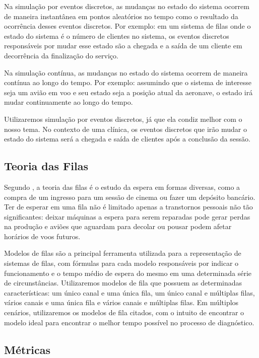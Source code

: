 \documentclass[
    12pt,
    openright,
    oneside,
    a4paper,
    english,
    brazil
]{abntex2}
\begin{document}
Na simulação por eventos discretos, as mudanças no estado do sistema ocorrem de maneira instantânea em pontos aleatórios no tempo como o resultado da ocorrência desses eventos discretos. Por exemplo: em um sistema de filas onde o estado do sistema é o número de clientes no sistema, os eventos discretos responsáveis por mudar esse estado são a chegada e a saída de um cliente em decorrência da finalização do serviço.

Na simulação contínua, as mudanças no estado do sistema ocorrem de maneira contínua ao longo do tempo. Por exemplo: assumindo que o sistema de interesse seja um avião em voo e seu estado seja a posição atual da aeronave, o estado irá mudar continuamente ao longo do tempo.

Utilizaremos simulação por eventos discretos, já que ela condiz melhor com o nosso tema. No contexto de uma clínica, os eventos discretos que irão mudar o estado do sistema será a chegada e saída de clientes após a conclusão da sessão.

\subsection{Teoria das Filas}

Segundo , a teoria das filas é o estudo da espera em formas diversas, como a compra de um ingresso para um sessão de cinema ou fazer um depósito bancário. Ter de esperar em uma fila não é limitado apenas a transtornos pessoais não tão significantes: deixar máquinas a espera para serem reparadas pode gerar perdas na produção e aviões que aguardam para decolar ou pousar podem afetar horários de voos futuros.

Modelos de filas são a principal ferramenta utilizada para a representação de sistemas de filas, com fórmulas para cada modelo responsáveis por indicar o funcionamento e o tempo médio de espera do mesmo em uma determinada série de circunstâncias. Utilizaremos modelos de fila que possuem as determinadas características: um único canal e uma única fila, um único canal e múltiplas filas, vários canais e uma única fila e vários canais e múltiplas filas. Em múltiplos cenários, utilizaremos os modelos de fila citados, com o intuito de encontrar o modelo ideal para encontrar o melhor tempo possível no processo de diagnóstico.

\subsection{Métricas}
\end{document}
